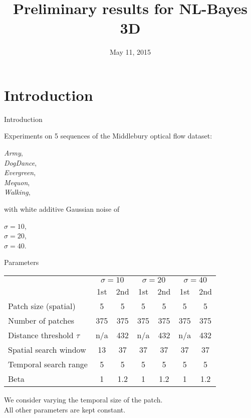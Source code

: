 \documentclass[mathserif, 8pt]{beamer}
\title[NLB3D]{$\,$ \\ $\,$ \\ Preliminary results for NL-Bayes 3D}
\author[Pablo Arias]{May 11, 2015}
\institute[CMLA]{}
\date[]{}
\begin{document}
\begin{frame}
    \titlepage
\end{frame}

\section{Introduction}

\begin{frame}{Introduction}

	\begin{center}
	Experiments on 5 sequences of the Middlebury optical flow dataset:

	\bigskip

	\emph{Army}, \\
	\emph{DogDance}, \\
	\emph{Evergreen}, \\
	\emph{Mequon}, \\
	\emph{Walking},

	\bigskip

	with white additive Gaussian noise of 

	\bigskip
	
	$\sigma = 10$, \\ 
	$\sigma = 20$, \\ 
	$\sigma = 40$.
	\end{center}

\end{frame}

\begin{frame}{Parameters}
	\begin{center}

	\begin{tabular}{l | c c | c c | c c }
		& \multicolumn{2}{c|}{$\sigma = 10$} 
		& \multicolumn{2}{c|}{$\sigma = 20$} 
		& \multicolumn{2}{c}{$\sigma = 40$} \\
		                            & 1st  & 2nd  & 1st  & 2nd  & 1st  & 2nd \\\hline\hline
		Patch size (spatial)        &  5   &   5  &  5   &   5  &  5   &   5 \\
		Number of patches           & 375  & 375  & 375  & 375  & 375  & 375 \\
		Distance threshold $\tau$   & n/a  & 432  & n/a  & 432  & n/a  & 432 \\
		Spatial search window       & 13   & 37   & 37   & 37   & 37   & 37  \\
		Temporal search range       & 5    & 5    & 5    & 5    & 5    & 5   \\\hline
		Beta                        & 1    & 1.2  & 1    & 1.2  & 1    & 1.2 \\\hline
	\end{tabular}

	\bigskip
	\bigskip
	\bigskip

	We consider varying the temporal size of the patch.\\ All other parameters are kept constant.

	\end{center}
\end{frame}
\end{document}

